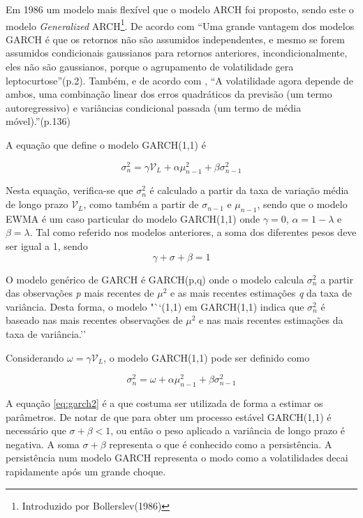 \documentclass[
  12pt,
  a4paper,
  openany]{book}
\begin{document}
Em 1986 um modelo mais flexível que o modelo ARCH foi proposto, sendo este o modelo \emph{Generalized} ARCH\footnote{Introduzido por Bollerslev(1986)}. De acordo com \citet{volatilitymodels} ``Uma grande vantagem dos modelos GARCH é que os retornos não são assumidos independentes, e mesmo se forem assumidos condicionais gaussianos para retornos anteriores, incondicionalmente, eles não são gaussianos, porque o agrupamento de volatilidade gera leptocurtose''(p.2). Também, e de acordo com \citet{portanalyse}, ``A volatilidade agora depende de ambos, uma combinação linear dos erros quadráticos da previsão (um termo autoregressivo) e variâncias condicional passada (um termo de média móvel).''(p.136)

A equação que define o modelo GARCH(1,1) é

\begin{equation} 
  \sigma_{n}^{2} = \gamma\mathcal{V}_{L} + \alpha\mu_{n-1}^{2} + \beta\sigma_{n-1}^{2}
  \label{eq:garch}
\end{equation}

Nesta equação, verifica-se que \(\sigma_{n}^{2}\) é calculado a partir da taxa de variação média de longo prazo \(\mathcal{V}_{L}\), como também a partir de \(\sigma_{n-1}\) e \(\mu_{n-1}\), sendo que o modelo EWMA é um caso particular do modelo GARCH(1,1) onde \(\gamma=0\), \(\alpha=1-\lambda\) e \(\beta=\lambda\). Tal como referido nos modelos anteriores, a soma dos diferentes pesos deve ser igual a 1, sendo \[\gamma+\sigma+\beta=1\]

O modelo genérico de GARCH é GARCH(p,q) onde o modelo calcula \(\sigma_{n}^{2}\) a partir das observações \emph{p} mais recentes de \(\mu^2\) e as mais recentes estimações \emph{q} da taxa de variância. Desta forma, o modelo "``(1,1) em GARCH(1,1) indica que \(\sigma_{n}^{2}\) é baseado nas mais recentes observações de \(\mu^2\) e nas mais recentes estimações da taxa de variância.''\citep[p.227]{Hull2018}

Considerando \(\omega=\gamma\mathcal{V}_{L}\), o modelo GARCH(1,1) pode ser definido como

\begin{equation} 
  \sigma_{n}^{2} = \omega + \alpha\mu_{n-1}^{2} + \beta\sigma_{n-1}^{2}
  \label{eq:garch2}
\end{equation}

A equação \eqref{eq:garch2} é a que costuma ser utilizada de forma a estimar os parâmetros. De notar de que para obter um processo estável GARCH(1,1) é necessário que \(\sigma+\beta<1\), ou então o peso aplicado a variância de longo prazo é negativa. A soma \(\sigma+\beta\) representa o que é conhecido como a persistência. A persistência num modelo GARCH representa o modo como a volatilidades decai rapidamente após um grande choque.
\end{document}
